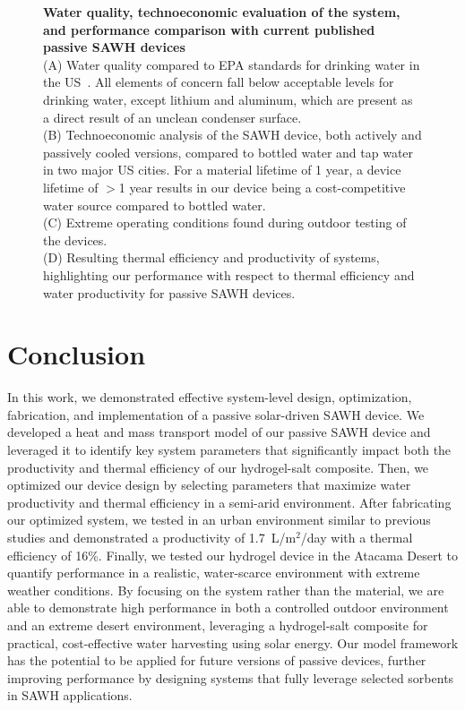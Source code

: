 \documentclass[11pt]{article}
\begin{document}
\begin{figure}[t]
\centering
{}
\caption{\textbf{Water quality, technoeconomic evaluation of the system, and performance comparison with current published passive SAWH devices} \\
(A) Water quality compared to EPA standards for drinking water in the US~\cite{epa2023}. All elements of concern fall below acceptable levels for drinking water, except lithium and aluminum, which are present as a direct result of an unclean condenser surface. \\
(B) Technoeconomic analysis of the SAWH device, both actively and passively cooled versions, compared to bottled water and tap water in two major US cities. For a material lifetime of 1 year, a device lifetime of $>$1 year results in our device being a cost-competitive water source compared to bottled water. \\
(C) Extreme operating conditions found during outdoor testing of the devices. \\
(D) Resulting thermal efficiency and productivity of systems, highlighting our performance with respect to thermal efficiency and water productivity for passive SAWH devices.}
\label{fig:fig5}
\end{figure}

\section{Conclusion}

In this work, we demonstrated effective system-level design, optimization, fabrication, and implementation of a passive solar-driven SAWH device. We developed a heat and mass transport model of our passive SAWH device and leveraged it to identify key system parameters that significantly impact both the productivity and thermal efficiency of our hydrogel-salt composite. Then, we optimized our device design by selecting parameters that maximize water productivity and thermal efficiency in a semi-arid environment. After fabricating our optimized system, we tested in an urban environment similar to previous studies and demonstrated a productivity of 1.7~L/m$^2$/day with a thermal efficiency of 16\%. Finally, we tested our hydrogel device in the Atacama Desert to quantify performance in a realistic, water-scarce environment with extreme weather conditions. By focusing on the system rather than the material, we are able to demonstrate high performance in both a controlled outdoor environment and an extreme desert environment, leveraging a hydrogel-salt composite for practical, cost-effective water harvesting using solar energy. Our model framework has the potential to be applied for future versions of passive devices, further improving performance by designing systems that fully leverage selected sorbents in SAWH applications.
\end{document}
